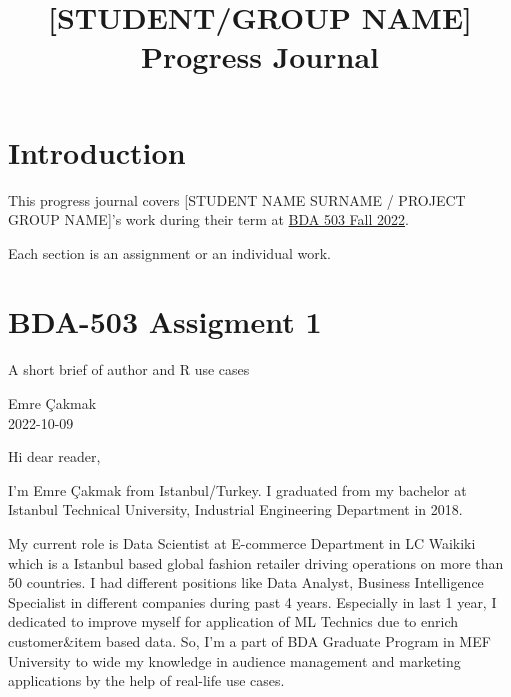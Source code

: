 \documentclass[
  letterpaper,
  DIV=11,
  numbers=noendperiod]{scrreprt}
\title{{[}STUDENT/GROUP NAME{]} Progress Journal}
\author{}
\date{}
\renewcommand*\contentsname{Table of contents}
\newcommand\contentsname{Table of contents}
\begin{document}
\maketitle
\ifdefined\Shaded\renewenvironment{Shaded}{\begin{tcolorbox}[frame hidden, interior hidden, borderline west={3pt}{0pt}{shadecolor}, enhanced, breakable, boxrule=0pt, sharp corners]}{\end{tcolorbox}}\fi

\renewcommand*\contentsname{Table of contents}
{
\hypersetup{linkcolor=}
\setcounter{tocdepth}{2}
\tableofcontents
}

\hypertarget{introduction}{%
\chapter*{Introduction}\label{introduction}}

This progress journal covers {[}STUDENT NAME SURNAME / PROJECT GROUP
NAME{]}'s work during their term at
\href{https://mef-bda503.github.io/fall22/}{BDA 503 Fall 2022}.

Each section is an assignment or an individual work.


\hypertarget{bda-503-assigment-1}{%
\chapter{BDA-503 Assigment 1}\label{bda-503-assigment-1}}

A short brief of author and R use cases

Emre Çakmak\\
2022-10-09

\hfill\break

Hi dear reader,

I'm Emre Çakmak from Istanbul/Turkey. I graduated from my bachelor at
Istanbul Technical University, Industrial Engineering Department in
2018.

My current role is Data Scientist at E-commerce Department in LC Waikiki
which is a Istanbul based global fashion retailer driving operations on
more than 50 countries. I had different positions like Data Analyst,
Business Intelligence Specialist in different companies during past 4
years. Especially in last 1 year, I dedicated to improve myself for
application of ML Technics due to enrich customer\&item based data. So,
I'm a part of BDA Graduate Program in MEF University to wide my
knowledge in audience management and marketing applications by the help
of real-life use cases.
\end{document}
